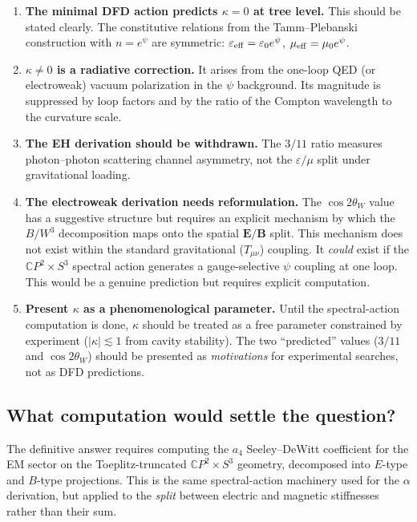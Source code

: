 \documentclass[11pt,a4paper]{article}
\newcommand{\vE}{\mathbf{E}}
\newcommand{\vB}{\mathbf{B}}
\begin{document}
\begin{enumerate}
\item \textbf{The minimal DFD action predicts $\kappa = 0$ at tree level.}
  This should be stated clearly.  The constitutive relations from the
  Tamm--Plebanski construction with $n = e^\psi$ are symmetric:
  $\varepsilon_{\rm eff} = \varepsilon_0 e^{\psi}$,
  $\mu_{\rm eff} = \mu_0 e^{\psi}$.

\item \textbf{$\kappa \neq 0$ is a radiative correction.}  It arises from
  the one-loop QED (or electroweak) vacuum polarization in the $\psi$
  background.  Its magnitude is suppressed by loop factors and by the
  ratio of the Compton wavelength to the curvature scale.

\item \textbf{The EH derivation should be withdrawn.}  The $3/11$ ratio
  measures photon--photon scattering channel asymmetry, not the
  $\varepsilon/\mu$ split under gravitational loading.

\item \textbf{The electroweak derivation needs reformulation.}  The
  $\cos 2\theta_W$ value has a suggestive structure but requires an
  explicit mechanism by which the $B/W^3$ decomposition maps onto the
  spatial $\vE/\vB$ split.  This mechanism does not exist within the
  standard gravitational ($T_{\mu\nu}$) coupling.  It \emph{could}
  exist if the $\mathbb{C}P^2 \times S^3$ spectral action generates a
  gauge-selective $\psi$ coupling at one loop.  This would be a genuine
  prediction but requires explicit computation.

\item \textbf{Present $\kappa$ as a phenomenological parameter.}  Until
  the spectral-action computation is done, $\kappa$ should be treated as
  a free parameter constrained by experiment ($|\kappa| \lesssim 1$ from
  cavity stability).  The two ``predicted'' values ($3/11$ and $\cos 2\theta_W$)
  should be presented as \emph{motivations} for experimental searches,
  not as DFD predictions.
\end{enumerate}

\subsection{What computation would settle the question?}

The definitive answer requires computing the $a_4$ Seeley--DeWitt coefficient
for the EM sector on the Toeplitz-truncated $\mathbb{C}P^2 \times S^3$
geometry, decomposed into $E$-type and $B$-type projections.  This is the
same spectral-action machinery used for the $\alpha$ derivation, but
applied to the \emph{split} between electric and magnetic stiffnesses
rather than their sum.
\end{document}
